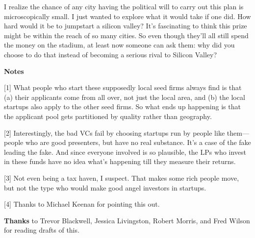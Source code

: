 I realize the chance of any city having the political will to carry out
this plan is microscopically small. I just wanted to explore what it
would take if one did. How hard would it be to jumpstart a silicon
valley? It's fascinating to think this prize might be within the reach
of so many cities. So even though they'll all still spend the money on
the stadium, at least now someone can ask them: why did you choose to do
that instead of becoming a serious rival to Silicon Valley?

\textbf{Notes}

{[}1{]} What people who start these supposedly local seed firms always
find is that (a) their applicants come from all over, not just the local
area, and (b) the local startups also apply to the other seed firms. So
what ends up happening is that the applicant pool gets partitioned by
quality rather than geography.

{[}2{]} Interestingly, the bad VCs fail by choosing startups run by
people like them---people who are good presenters, but have no real
substance. It's a case of the fake leading the fake. And since everyone
involved is so plausible, the LPs who invest in these funds have no idea
what's happening till they measure their returns.

{[}3{]} Not even being a tax haven, I suspect. That makes some rich
people move, but not the type who would make good angel investors in
startups.

{[}4{]} Thanks to Michael Keenan for pointing this out.

\textbf{Thanks} to Trevor Blackwell, Jessica Livingston, Robert Morris,
and Fred Wilson for reading drafts of this.
